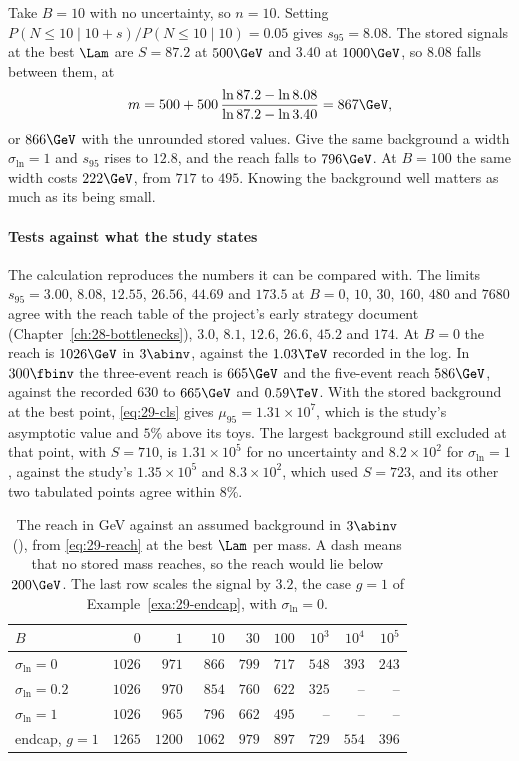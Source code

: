 \begin{example}\label{exa:29-point}
Take $B=10$ with no uncertainty, so $n=10$. Setting $P(N\le10\mid10+s)/P(N\le10\mid10)=0.05$ gives $s_{95}=8.08$. The stored signals at the best $\Lam$ are $S=87.2$ at $500\GeV$ and $3.40$ at $1000\GeV$, so $8.08$ falls between them, at
\[
  m=500+500\,\frac{\ln87.2-\ln8.08}{\ln87.2-\ln3.40}=867\GeV ,
\]
or $866\GeV$ with the unrounded stored values.
Give the same background a width $\sigma_{\ln}=1$ and $s_{95}$ rises to $12.8$, and the reach falls to $796\GeV$. At $B=100$ the same width costs $222\GeV$, from $717$ to $495$. Knowing the background well matters as much as its being small.
\end{example}

\paragraph{Tests against what the study states}
The calculation reproduces the numbers it can be compared with. The limits $s_{95}=3.00$, $8.08$, $12.55$, $26.56$, $44.69$ and $173.5$ at $B=0$, $10$, $30$, $160$, $480$ and $7680$ agree with the reach table of the project's early strategy document (Chapter~\ref{ch:28-bottlenecks}), $3.0$, $8.1$, $12.6$, $26.6$, $45.2$ and $174$. At $B=0$ the reach is $1026\GeV$ in $3\abinv$, against the $1.03\TeV$ recorded in the log. In $300\fbinv$ the three-event reach is $665\GeV$ and the five-event reach $586\GeV$, against the recorded $630$ to $665\GeV$ and $0.59\TeV$. With the stored background at the best point, \eqref{eq:29-cls} gives $\mu_{95}=1.31\times10^7$, which is the study's asymptotic value and $5\%$ above its toys. The largest background still excluded at that point, with $S=710$, is $1.31\times10^5$ for no uncertainty and $8.2\times10^2$ for $\sigma_{\ln}=1$, against the study's $1.35\times10^5$ and $8.3\times10^2$, which used $S=723$, and its other two tabulated points agree within $8\%$.

\begin{table}
  \caption{The reach in GeV against an assumed background in $3\abinv$ (\EST), from \eqref{eq:29-reach} at the best $\Lam$ per mass. A dash means that no stored mass reaches, so the reach would lie below $200\GeV$. The last row scales the signal by $3.2$, the case $g=1$ of Example~\ref{exa:29-endcap}, with $\sigma_{\ln}=0$.}
  \label{tab:29-reach}
  \small\setlength{\tabcolsep}{4pt}
  \begin{tabular}{@{}lrrrrrrrr@{}}
    \toprule
    $B$ & $0$ & $1$ & $10$ & $30$ & $100$ & $10^3$ & $10^4$ & $10^5$\\
    \midrule
    $\sigma_{\ln}=0$ & $1026$ & $971$ & $866$ & $799$ & $717$ & $548$ & $393$ & $243$\\
    $\sigma_{\ln}=0.2$ & $1026$ & $970$ & $854$ & $760$ & $622$ & $325$ & -- & --\\
    $\sigma_{\ln}=1$ & $1026$ & $965$ & $796$ & $662$ & $495$ & -- & -- & --\\
    \midrule
    endcap, $g=1$ & $1265$ & $1200$ & $1062$ & $979$ & $897$ & $729$ & $554$ & $396$\\
    \bottomrule
  \end{tabular}
\end{table}

